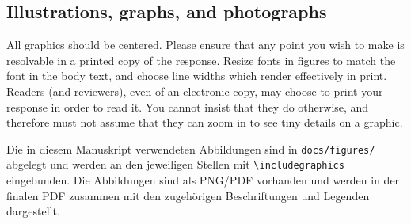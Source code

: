 \documentclass[10pt,twocolumn,letterpaper]{article}
\begin{document}
\subsection{Illustrations, graphs, and photographs}

All graphics should be centered.
Please ensure that any point you wish to make is resolvable in a printed copy of the response.
Resize fonts in figures to match the font in the body text, and choose line widths which render effectively in print.
Readers (and reviewers), even of an electronic copy, may choose to print your response in order to read it.
You cannot insist that they do otherwise, and therefore must not assume that they can zoom in to see tiny details on a graphic.

Die in diesem Manuskript verwendeten Abbildungen sind in \texttt{docs/figures/} abgelegt und werden an den jeweiligen Stellen
mit \verb+\includegraphics+ eingebunden. Die Abbildungen sind als PNG/PDF
vorhanden und werden in der finalen PDF zusammen mit den zugehörigen
Beschriftungen und Legenden dargestellt.

    {
        \small
        
        
    }
\end{document}
